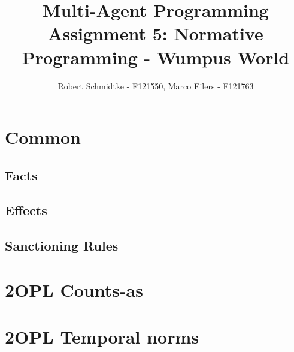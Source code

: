 \documentclass[a4paper,11pt]{article}
\begin{document}
\title{Multi-Agent Programming\\Assignment 5: Normative Programming - Wumpus World}
\author{Robert Schmidtke - F121550, Marco Eilers - F121763}

\maketitle
\newpage

\section{Common}
\subsection{Facts}

\subsection{Effects}

\subsection{Sanctioning Rules}


\section{2OPL Counts-as}


\section{2OPL Temporal norms}
\end{document}
